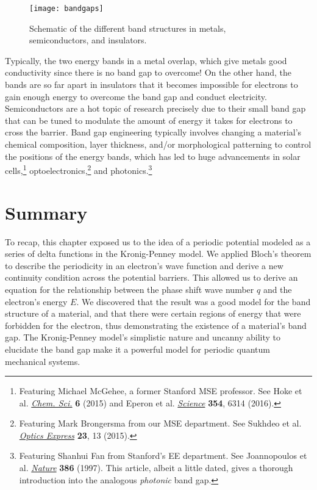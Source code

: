 \begin{figure}[!h]
	\centering
	\texttt{[image: bandgaps]}
	\caption{Schematic of the different band structures in metals, semiconductors, and insulators.}
	\label{fig:bgs}
\end{figure}

Typically, the two energy bands in a metal overlap, which give metals good conductivity since there is no band gap to overcome! On the other hand, the bands are so far apart in insulators that it becomes impossible for electrons to gain enough energy to overcome the band gap and conduct electricity. Semiconductors are a hot topic of research precisely due to their small band gap that can be tuned to modulate the amount of energy it takes for electrons to cross the barrier. Band gap engineering typically involves changing a material's chemical composition, layer thickness, and/or morphological patterning to control the positions of the energy bands, which has led to huge advancements in solar cells,\footnote{Featuring Michael McGehee, a former Stanford MSE professor. See Hoke et al. \href{http://pubs.rsc.org/-/content/articlehtml/2015/sc/c4sc03141e}{\emph{Chem. Sci.}} \textbf{6} (2015) and Eperon et al. \href{http://science.sciencemag.org/content/354/6314/861.full}{\emph{Science}} \textbf{354}, 6314 (2016).} optoelectronics,\footnote{Featuring Mark Brongersma from our MSE department. See Sukhdeo et al. \href{https://www.osapublishing.org/oe/abstract.cfm?uri=oe-23-13-16740}{\emph{Optics Express}} \textbf{23}, 13 (2015).} and photonics.\footnote{Featuring Shanhui Fan from Stanford's EE department. See Joannopoulos et al. \href{https://www.nature.com/nature/journal/v386/n6621/pdf/386143a0.pdf}{\emph{Nature}} \textbf{386} (1997). This article, albeit a little dated, gives a thorough introduction into the analogous \emph{photonic} band gap.}


\section{Summary}
To recap, this chapter exposed us to the idea of a periodic potential modeled as a series of delta functions in the Kronig-Penney model. We applied Bloch's theorem to describe the periodicity in an electron's wave function and derive a new continuity condition across the potential barriers. This allowed us to derive an equation for the relationship between the phase shift wave number $q$ and the electron's energy $E$. We discovered that the result was a good model for the band structure of a material, and that there were certain regions of energy that were forbidden for the electron, thus demonstrating the existence of a material's band gap. The Kronig-Penney model's simplistic nature and uncanny ability to elucidate the band gap make it a powerful model for periodic quantum mechanical systems. \par 

